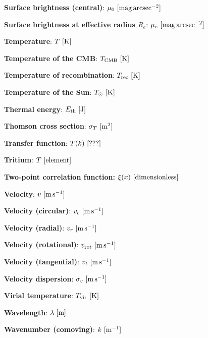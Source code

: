 \documentclass[a4paper,11pt]{article}
\begin{document}
{\noindent}\textbf{Surface brightness (central)}: $\mu_0 ~ [{\rm mag\,arcsec^{-2}}]$

{\noindent}\textbf{Surface brightness at effective radius $R_e$}: $\mu_e ~ [{\rm mag\,arcsec^{-2}}]$

{\noindent}\textbf{Temperature}: $T ~ [{\rm K}]$

{\noindent}\textbf{Temperature of the CMB}: $T_{\rm CMB} ~ [{\rm K}]$

{\noindent}\textbf{Temperature of recombination}: $T_{\rm rec} ~ [{\rm K}]$

{\noindent}\textbf{Temperature of the Sun}: $T_\odot ~ [{\rm K}]$

{\noindent}\textbf{Thermal energy}: $E_\mathrm{th} ~ [{\rm J}]$

{\noindent}\textbf{Thomson cross section}: $\sigma_T ~ [{\rm m^2}]$

{\noindent}\textbf{Transfer function}: $T(k) ~ [{\rm ???}]$

{\noindent}\textbf{Tritium}: $T ~ [{\rm element}]$

{\noindent}\textbf{Two-point correlation function:} $\xi(x) ~ [{\rm dimensionless}]$

{\noindent}\textbf{Velocity}: $v ~ [{\rm m\,s^{-1}}]$

{\noindent}\textbf{Velocity (circular)}: $v_c ~ [{\rm m\,s^{-1}}]$

{\noindent}\textbf{Velocity (radial)}: $v_r ~ [{\rm m\,s^{-1}}]$

{\noindent}\textbf{Velocity (rotational)}: $v_\mathrm{rot} ~ [{\rm m\,s^{-1}}]$

{\noindent}\textbf{Velocity (tangential)}: $v_t ~ [{\rm m\,s^{-1}}]$

{\noindent}\textbf{Velocity dispersion}: $\sigma_v ~ [{\rm m\,s^{-1}}]$

{\noindent}\textbf{Virial temperature}: $T_\mathrm{vir} ~ [{\rm K}]$

{\noindent}\textbf{Wavelength}: $\lambda ~ [{\rm m}]$

{\noindent}\textbf{Wavenumber (comoving)}: $k ~ [{\rm m^{-1}}]$
\end{document}
